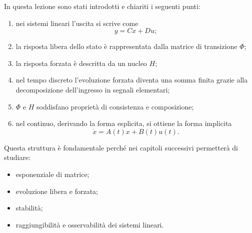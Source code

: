 In questa lezione sono stati introdotti e chiariti i seguenti punti:
\begin{enumerate}
    \item nei sistemi lineari l'uscita si scrive come
    \[
    y=Cx+Du;
    \]
    \item la risposta libera dello stato è rappresentata dalla matrice di transizione $\Phi$;
    \item la risposta forzata è descritta da un nucleo $H$;
    \item nel tempo discreto l'evoluzione forzata diventa una somma finita grazie alla decomposizione dell'ingresso in segnali elementari;
    \item $\Phi$ e $H$ soddisfano proprietà di consistenza e composizione;
    \item nel continuo, derivando la forma esplicita, si ottiene la forma implicita
    \[
    \dot x=A(t)x+B(t)u(t).
    \]
\end{enumerate}

Questa struttura è fondamentale perché nei capitoli successivi permetterà di studiare:
\begin{itemize}
    \item esponenziale di matrice;
    \item evoluzione libera e forzata;
    \item stabilità;
    \item raggiungibilità e osservabilità dei sistemi lineari.
\end{itemize}